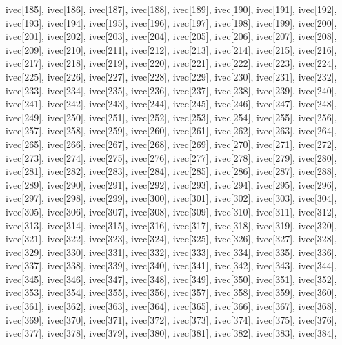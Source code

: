 \begin{DoxyCode}
{  ivec[185],
  ivec[186],
  ivec[187],
  ivec[188],
  ivec[189],
  ivec[190],
  ivec[191],
  ivec[192],
  ivec[193],
  ivec[194],
  ivec[195],
  ivec[196],
  ivec[197],
  ivec[198],
  ivec[199],
  ivec[200],
  ivec[201],
  ivec[202],
  ivec[203],
  ivec[204],
  ivec[205],
  ivec[206],
  ivec[207],
  ivec[208],
  ivec[209],
  ivec[210],
  ivec[211],
  ivec[212],
  ivec[213],
  ivec[214],
  ivec[215],
  ivec[216],
  ivec[217],
  ivec[218],
  ivec[219],
  ivec[220],
  ivec[221],
  ivec[222],
  ivec[223],
  ivec[224],
  ivec[225],
  ivec[226],
  ivec[227],
  ivec[228],
  ivec[229],
  ivec[230],
  ivec[231],
  ivec[232],
  ivec[233],
  ivec[234],
  ivec[235],
  ivec[236],
  ivec[237],
  ivec[238],
  ivec[239],
  ivec[240],
  ivec[241],
  ivec[242],
  ivec[243],
  ivec[244],
  ivec[245],
  ivec[246],
  ivec[247],
  ivec[248],
  ivec[249],
  ivec[250],
  ivec[251],
  ivec[252],
  ivec[253],
  ivec[254],
  ivec[255],
  ivec[256],
  ivec[257],
  ivec[258],
  ivec[259],
  ivec[260],
  ivec[261],
  ivec[262],
  ivec[263],
  ivec[264],
  ivec[265],
  ivec[266],
  ivec[267],
  ivec[268],
  ivec[269],
  ivec[270],
  ivec[271],
  ivec[272],
  ivec[273],
  ivec[274],
  ivec[275],
  ivec[276],
  ivec[277],
  ivec[278],
  ivec[279],
  ivec[280],
  ivec[281],
  ivec[282],
  ivec[283],
  ivec[284],
  ivec[285],
  ivec[286],
  ivec[287],
  ivec[288],
  ivec[289],
  ivec[290],
  ivec[291],
  ivec[292],
  ivec[293],
  ivec[294],
  ivec[295],
  ivec[296],
  ivec[297],
  ivec[298],
  ivec[299],
  ivec[300],
  ivec[301],
  ivec[302],
  ivec[303],
  ivec[304],
  ivec[305],
  ivec[306],
  ivec[307],
  ivec[308],
  ivec[309],
  ivec[310],
  ivec[311],
  ivec[312],
  ivec[313],
  ivec[314],
  ivec[315],
  ivec[316],
  ivec[317],
  ivec[318],
  ivec[319],
  ivec[320],
  ivec[321],
  ivec[322],
  ivec[323],
  ivec[324],
  ivec[325],
  ivec[326],
  ivec[327],
  ivec[328],
  ivec[329],
  ivec[330],
  ivec[331],
  ivec[332],
  ivec[333],
  ivec[334],
  ivec[335],
  ivec[336],
  ivec[337],
  ivec[338],
  ivec[339],
  ivec[340],
  ivec[341],
  ivec[342],
  ivec[343],
  ivec[344],
  ivec[345],
  ivec[346],
  ivec[347],
  ivec[348],
  ivec[349],
  ivec[350],
  ivec[351],
  ivec[352],
  ivec[353],
  ivec[354],
  ivec[355],
  ivec[356],
  ivec[357],
  ivec[358],
  ivec[359],
  ivec[360],
  ivec[361],
  ivec[362],
  ivec[363],
  ivec[364],
  ivec[365],
  ivec[366],
  ivec[367],
  ivec[368],
  ivec[369],
  ivec[370],
  ivec[371],
  ivec[372],
  ivec[373],
  ivec[374],
  ivec[375],
  ivec[376],
  ivec[377],
  ivec[378],
  ivec[379],
  ivec[380],
  ivec[381],
  ivec[382],
  ivec[383],
  ivec[384],
}
\end{DoxyCode}
